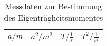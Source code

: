\begin{table}[h!]
  \centering
  \caption{Messdaten zur Bestimmung des Eigenträgheitsmomentes}
  \label{tab:ETM}
  \begin{tabular}{c c c c}
    \toprule
     $a/m$ &  $a^2/m^2$	 &  $T/\frac{1}{s}$ & $T^2/\frac{1}{s^2}$ \\
    \midrule
      
    \bottomrule
  \end{tabular}
\end{table}
